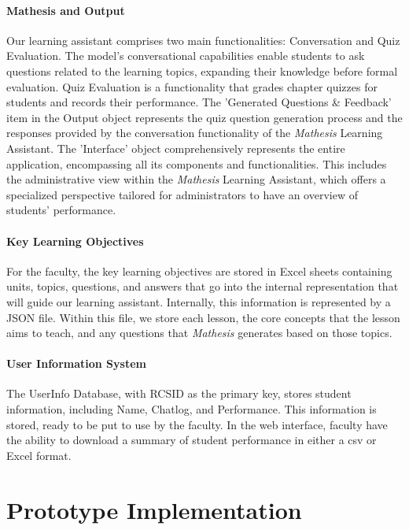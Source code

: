 \documentclass[12pt,a4paper]{article}
\begin{document}
    \paragraph{Mathesis and Output}
    Our learning assistant comprises two main functionalities: Conversation and Quiz Evaluation.
    The model's conversational capabilities enable students to ask questions related to the learning
    topics, expanding their knowledge before formal evaluation. Quiz Evaluation is a functionality
    that grades chapter quizzes for students and records their performance. The 'Generated Questions
    \& Feedback' item in the Output object represents the quiz question generation process and the
    responses provided by the conversation functionality of the \textit{Mathesis} Learning Assistant. The
    'Interface' object comprehensively represents the entire application, encompassing all its
    components and functionalities.  This includes the administrative view within the \textit{Mathesis}
    Learning Assistant, which offers a specialized perspective tailored for administrators to have
    an overview of students' performance.

    \paragraph{Key Learning Objectives}
    For the faculty, the key learning
    objectives are stored in Excel sheets containing units, topics, questions, and answers that
    go into the internal representation that will guide our learning assistant.  Internally, this
    information is represented by a JSON file.  Within this file, we store each lesson, the core
    concepts that the lesson aims to teach, and any questions that \textit{Mathesis} generates based
    on those topics.

    \paragraph{User Information System}
    The UserInfo Database, with RCSID as the primary key, stores student information, including Name,
    Chatlog, and Performance.  This information is stored, ready to be put to use by the faculty.
    In the web interface, faculty have the ability to download a summary of student performance
    in either a csv or Excel format.


    \section{Prototype Implementation}
\end{document}
